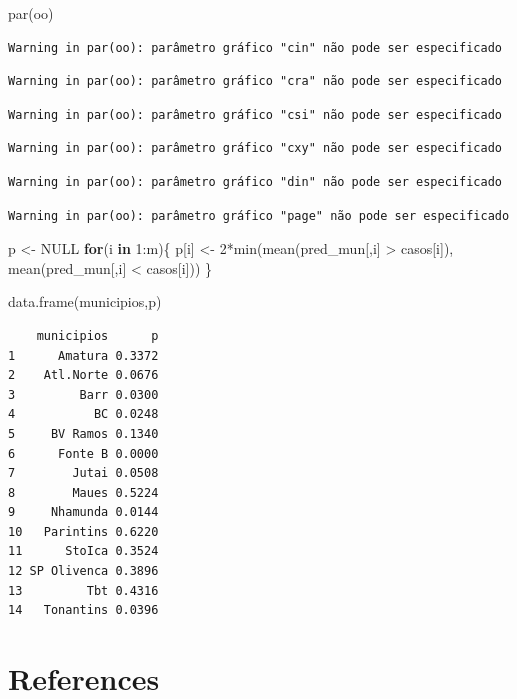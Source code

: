 \documentclass[
  letterpaper,
  DIV=11,
  numbers=noendperiod]{scrreprt}
\newenvironment{Shaded}{\begin{snugshade}}{\end{snugshade}}
\newcommand{\ConstantTok}[1]{\textcolor[rgb]{0.56,0.35,0.01}{#1}}
\newcommand{\ControlFlowTok}[1]{\textcolor[rgb]{0.00,0.23,0.31}{\textbf{#1}}}
\newcommand{\DecValTok}[1]{\textcolor[rgb]{0.68,0.00,0.00}{#1}}
\newcommand{\FunctionTok}[1]{\textcolor[rgb]{0.28,0.35,0.67}{#1}}
\newcommand{\NormalTok}[1]{\textcolor[rgb]{0.00,0.23,0.31}{#1}}
\newcommand{\OtherTok}[1]{\textcolor[rgb]{0.00,0.23,0.31}{#1}}
\newcommand{\SpecialCharTok}[1]{\textcolor[rgb]{0.37,0.37,0.37}{#1}}
\newlength{\cslhangindent}
\newenvironment{CSLReferences}[2] %
 {\begin{list}{}{%
  \setlength{\itemindent}{0pt}
  \setlength{\leftmargin}{0pt}
  \setlength{\parsep}{0pt}
  \ifodd #1
   \setlength{\leftmargin}{\cslhangindent}
   \setlength{\itemindent}{-1\cslhangindent}
  \fi
  \setlength{\itemsep}{#2\baselineskip}}}
 {\end{list}}
\theoremstyle{plain}
\theoremstyle{definition}
\theoremstyle{definition}
\theoremstyle{remark}
\begin{document}
\begin{Shaded}
\begin{Highlighting}[]
\FunctionTok{par}\NormalTok{(oo)}
\end{Highlighting}
\end{Shaded}

\begin{verbatim}
Warning in par(oo): parâmetro gráfico "cin" não pode ser especificado
\end{verbatim}

\begin{verbatim}
Warning in par(oo): parâmetro gráfico "cra" não pode ser especificado
\end{verbatim}

\begin{verbatim}
Warning in par(oo): parâmetro gráfico "csi" não pode ser especificado
\end{verbatim}

\begin{verbatim}
Warning in par(oo): parâmetro gráfico "cxy" não pode ser especificado
\end{verbatim}

\begin{verbatim}
Warning in par(oo): parâmetro gráfico "din" não pode ser especificado
\end{verbatim}

\begin{verbatim}
Warning in par(oo): parâmetro gráfico "page" não pode ser especificado
\end{verbatim}

\begin{Shaded}
\begin{Highlighting}[]
\NormalTok{p }\OtherTok{\textless{}{-}} \ConstantTok{NULL}
\ControlFlowTok{for}\NormalTok{(i }\ControlFlowTok{in} \DecValTok{1}\SpecialCharTok{:}\NormalTok{m)\{}
\NormalTok{p[i] }\OtherTok{\textless{}{-}} \DecValTok{2}\SpecialCharTok{*}\FunctionTok{min}\NormalTok{(}\FunctionTok{mean}\NormalTok{(pred\_mun[,i] }\SpecialCharTok{\textgreater{}}\NormalTok{ casos[i]),}
\FunctionTok{mean}\NormalTok{(pred\_mun[,i] }\SpecialCharTok{\textless{}}\NormalTok{ casos[i]))}
\NormalTok{\}}

\FunctionTok{data.frame}\NormalTok{(municipios,p)}
\end{Highlighting}
\end{Shaded}

\begin{verbatim}
    municipios      p
1      Amatura 0.3372
2    Atl.Norte 0.0676
3         Barr 0.0300
4           BC 0.0248
5     BV Ramos 0.1340
6      Fonte B 0.0000
7        Jutai 0.0508
8        Maues 0.5224
9     Nhamunda 0.0144
10   Parintins 0.6220
11      StoIca 0.3524
12 SP Olivenca 0.3896
13         Tbt 0.4316
14   Tonantins 0.0396
\end{verbatim}


\chapter*{References}\label{references}


\label{refs}
\begin{CSLReferences}{0}{1}
\end{CSLReferences}
\end{document}
